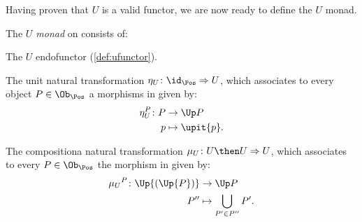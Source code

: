 Having proven that $U$ is a valid functor, we are now ready to define the $U$ monad.
\begin{definition}[$U$ monad]
    The \emph{$U$ monad} on \Pos consists of:
    \begin{compactenum}
        \item The $U$ endofunctor (\cref{def:ufunctor}).
        \item The unit natural transformation $\eta_U \colon \id_{\Pos}\Rightarrow U$, which associates to every object $P\in \Ob_\Pos$ a morphisms in \Pos given by:
        \begin{equation}
            \begin{aligned}
                \eta_{U}^P\colon P &\to \Up P\\
                p&\mapsto \upit \{p\}.
            \end{aligned}
        \end{equation}
        \item The compositiona natural transformation $\mu_U\colon U\then U\Rightarrow U$, which associates to every $P\in \Ob_\Pos$ the morphism in \Pos given by:
        \begin{equation}
            \begin{aligned}
                \mu{_U}^P\colon \Up{(\Up{P})}&\to \Up P\\
                P''&\mapsto \bigcup_{P'\in P''}P'.
            \end{aligned}
        \end{equation}
    \end{compactenum}
\end{definition}

